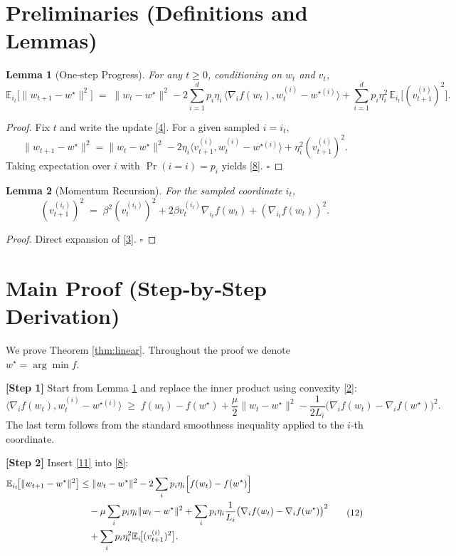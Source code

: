 \documentclass{article}
\newtheorem{lemma}{Lemma}
\newcommand{\E}{\mathbb{E}}
\begin{document}
\section*{Preliminaries (Definitions and Lemmas)}
\begin{lemma}[One‑step Progress]\label{lem:one}
For any $t\ge0$, conditioning on $w_t$ and $v_t$,
\[
\E_{i_t}\!\bigl[ \|w_{t+1}-w^{\star}\|^{2} \bigr]
\;=\;
\|w_{t}-w^{\star}\|^{2}
-2\sum_{i=1}^{d}p_i\eta_i\,
\langle \nabla_i f(w_t), w_t^{(i)}-w^{\star(i)}\rangle
+\sum_{i=1}^{d}p_i\eta_i^{2}\,
\E_{i_t}\!\bigl[ (v_{t+1}^{(i)})^{2}\bigr].
\tag{8}
\]
\end{lemma}
\begin{proof}
Fix $t$ and write the update \eqref{4}. For a given sampled $i=i_t$,
\[
\|w_{t+1}-w^{\star}\|^{2}
= \|w_{t}-w^{\star}\|^{2}
-2\eta_i\langle v_{t+1}^{(i)}, w_t^{(i)}-w^{\star(i)}\rangle
+\eta_i^{2}(v_{t+1}^{(i)})^{2}.
\tag{9}
\]
Taking expectation over $i$ with $\Pr(i=i)=p_i$ yields \eqref{8}. $\square$
\end{proof}

\begin{lemma}[Momentum Recursion]\label{lem:momentum}
For the sampled coordinate $i_t$,
\[
(v_{t+1}^{(i_t)})^{2}
\;=\;
\beta^{2}(v_{t}^{(i_t)})^{2}+2\beta v_{t}^{(i_t)}\nabla_{i_t}f(w_t)
+(\nabla_{i_t}f(w_t))^{2}. \tag{10}
\]
\end{lemma}
\begin{proof}
Direct expansion of \eqref{3}. $\square$
\end{proof}

\section*{Main Proof (Step‑by‑Step Derivation)}
We prove Theorem \ref{thm:linear}. Throughout the proof we denote $w^{\star}=\arg\min f$.

\medskip
\noindent\textbf{[Step 1]}  Start from Lemma \ref{lem:one} and replace the inner product using convexity \eqref{2}:
\[
\langle \nabla_i f(w_t), w_t^{(i)}-w^{\star(i)}\rangle
\;\ge\;
f(w_t)-f(w^{\star})+\frac{\mu}{2}\|w_t-w^{\star}\|^{2}
-\frac{1}{2L_i}\bigl(\nabla_i f(w_t)-\nabla_i f(w^{\star})\bigr)^{2}.
\tag{11}
\]
The last term follows from the standard smoothness inequality applied to the $i$‑th coordinate.

\medskip
\noindent\textbf{[Step 2]}  Insert \eqref{11} into \eqref{8}:
\[
\begin{aligned}
\E_{i_t}\!\bigl[\|w_{t+1}-w^{\star}\|^{2}\bigr]
&\le \|w_t-w^{\star}\|^{2}
-2\sum_i p_i\eta_i\Bigl[f(w_t)-f(w^{\star})\Bigr]  \\
&\quad -\mu\sum_i p_i\eta_i\|w_t-w^{\star}\|^{2}
+ \sum_i p_i\eta_i\frac{1}{L_i}\bigl(\nabla_i f(w_t)-\nabla_i f(w^{\star})\bigr)^{2}\\
&\quad +\sum_i p_i\eta_i^{2}\E_{i}\!\bigl[(v_{t+1}^{(i)})^{2}\bigr].
\end{aligned}
\tag{12}
\]
\end{document}
